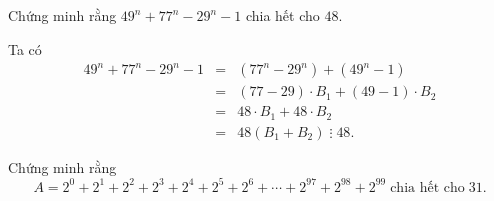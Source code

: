 \begin{vd}
Chứng minh rằng $ 49^n+77^n-29^n-1 $ chia hết cho $ 48 $.	
	
	\loigiai
	{
Ta có
{\allowdisplaybreaks \begin{eqnarray*}
49^n+77^n-29^n-1&=&\left(77^n-29^n\right)+\left(49^n-1\right)\\
&=&(77-29)\cdot B_1+(49-1)\cdot B_2\\
&=&48\cdot B_1+48\cdot B_2\\
&=&48(B_1+B_2)\;\vdots \;48.
\end{eqnarray*}}		
	}
\end{vd}


\begin{vd}
Chứng minh rằng
\[A=2^0+2^1+2^2+2^3+2^4+2^5+2^6+\cdots+2^{97}+2^{98}+2^{99} \;\text{chia hết cho}\;31.\]	
\end{vd}
\btvn

